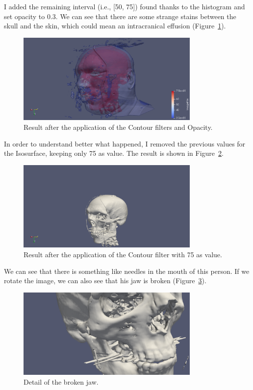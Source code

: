 \documentclass[a4paper]{article}
\begin{document}
I added the remaining interval (i.e., [50, 75]) found thanks to the histogram and set opacity to 0.3. We can see that there are some strange stains between the skull and the skin, which could mean an intracranical effusion (Figure~\ref{img:face_opacity}). 

\begin{figure}[htbp]
\centering
\includegraphics[width=0.8\textwidth]{res/opacity.png}
\caption{Result after the application of the Contour filters and Opacity.}
\label{img:face_opacity}
\end{figure}

In order to understand better what happened, I removed the previous values for the Isosurface, keeping only 75 as value. The result is shown in Figure~\ref{img:skull}.

\begin{figure}[htbp]
\centering
\includegraphics[width=0.8\textwidth]{res/skull.png}
\caption{Result after the application of the Contour filter with 75 as value.}
\label{img:skull}
\end{figure}

We can see that there is something like needles in the mouth of this person. If we rotate the image, we can also see that his jaw is broken (Figure~\ref{img:broken}).

\begin{figure}[htbp]
\centering
\includegraphics[width=0.8\textwidth]{res/broken.png}
\caption{Detail of the broken jaw.}
\label{img:broken}
\end{figure}
\end{document}

